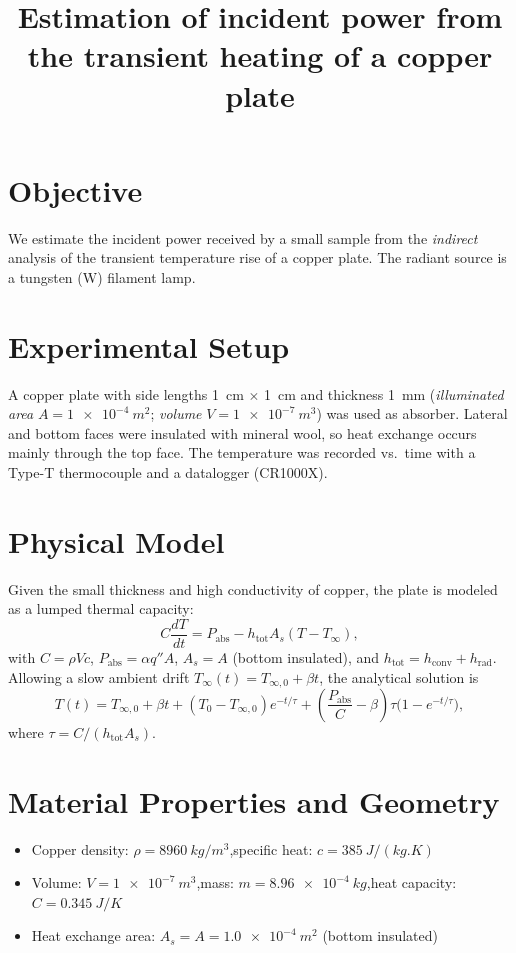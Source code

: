 \documentclass[a4paper,11pt]{article}
\title{Estimation of incident power from the transient heating of a copper plate}
\author{}
\date{}
\begin{document}
\maketitle

\section{Objective}
We estimate the incident power received by a small sample from the \emph{indirect} analysis of the transient temperature rise of a copper plate. The radiant source is a tungsten (W) filament lamp.

\section{Experimental Setup}
A copper plate with side lengths \SI{1}{\centi\metre} $\times$ \SI{1}{\centi\metre} and thickness \SI{1}{\milli\metre}
(\emph{illuminated area} $A=\SI{1e-4}{m^2}$; \emph{volume} $V=\SI{1e-7}{m^3}$) was used as absorber.
Lateral and bottom faces were insulated with mineral wool, so heat exchange occurs mainly through the top face.
The temperature was recorded vs.\ time with a Type-T thermocouple and a datalogger (CR1000X).

\section{Physical Model}
Given the small thickness and high conductivity of copper, the plate is modeled as a lumped thermal capacity:
\begin{equation}
  C \frac{dT}{dt} = P_{\text{abs}} - h_{\text{tot}} A_s (T - T_\infty),
\end{equation}
with $C = \rho V c$, $P_{\text{abs}}=\alpha q'' A$, $A_s=A$ (bottom insulated),
and $h_{\text{tot}}=h_{\text{conv}}+h_{\text{rad}}$.
Allowing a slow ambient drift $T_\infty(t)=T_{\infty,0}+\beta t$, the analytical solution is
\begin{equation}
  T(t) = T_{\infty,0} + \beta t
  + (T_0 - T_{\infty,0}) e^{-t/\tau}
  + \left(\frac{P_{\text{abs}}}{C}-\beta\right)\tau \bigl(1-e^{-t/\tau}\bigr),
\end{equation}
where $\tau=C/(h_{\text{tot}}A_s)$.

\section{Material Properties and Geometry}
\begin{itemize}
  \item Copper density: $\rho=\SI{8960}{kg/m^3}$,\quad specific heat: $c=\SI{385}{J/(kg.K)}$
  \item Volume: $V=\SI{1e-7}{m^3}$,\quad mass: $m=\SI{8.96e-4}{kg}$,\quad heat capacity: $C=\SI{0.345}{J/K}$
  \item Heat exchange area: $A_s=A=\SI{1.0e-4}{m^2}$ (bottom insulated)
\end{itemize}
\end{document}
